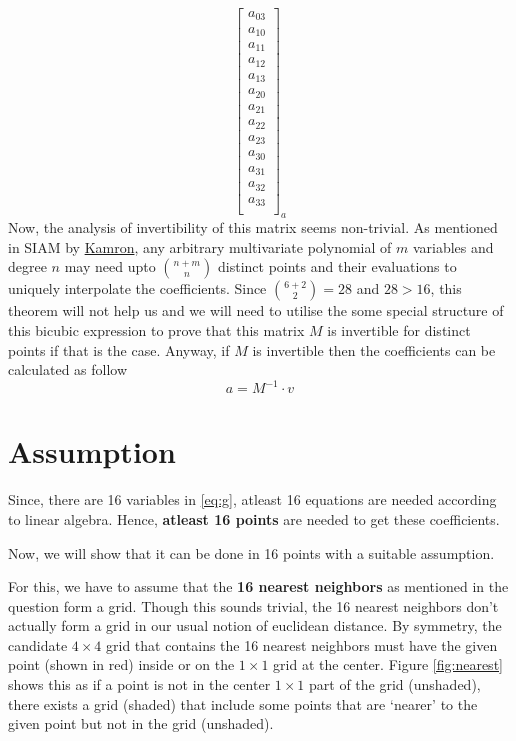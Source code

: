\documentclass[a4paper, landscape]{article}
\begin{document}
\begin{equation}
{\begin{bmatrix}
    a_{03}\\
    a_{10}\\
    a_{11}\\
    a_{12}\\
    a_{13}\\
    a_{20}\\
    a_{21}\\
    a_{22}\\
    a_{23}\\
    a_{30}\\
    a_{31}\\
    a_{32}\\
    a_{33}\\
    \end{bmatrix}
    }_{a}\label{eq:g}
\end{equation}
Now, the analysis of invertibility of this matrix seems non-trivial. As mentioned in SIAM by \href{https://evoq-n.org/Portals/0/Publications/SIURO/Vol1_Issue1/A_Simple_Expression_for_Multivariate.pdf}{Kamron}, any arbitrary multivariate polynomial of $m$ variables and degree $n$ may need upto $\binom{n+m}{n}$ distinct points and their evaluations to uniquely interpolate the coefficients. Since $\binom{6+2}{2}=28$ and $28>16$, this theorem will not help us and we will need to utilise the some special structure of this bicubic expression to prove that this matrix $M$ is invertible for distinct points if that is the case. Anyway, if $M$ is invertible then the coefficients can be calculated as follow
\begin{equation}
    a = M^{-1}\cdot v
\end{equation}
\section{Assumption}
Since, there are 16 variables in \ref{eq:g}, {atleast 16 equations} are needed according to linear algebra. Hence, \textbf{atleast 16 points} are needed to get these coefficients.

Now, we will show that it can be done in 16 points with a suitable assumption.

For this, we have to assume that the \textbf{16 nearest neighbors} as mentioned in the question form a grid. Though this sounds trivial, the 16 nearest neighbors don't actually form a grid in our usual notion of euclidean distance. By symmetry, the candidate $4\times4$ grid that contains the 16 nearest neighbors must have the given point (shown in red) inside or on the $1\times1$ grid at the center. Figure \ref{fig:nearest} shows this as if a point is not in the center $1\times1$ part of the grid (unshaded), there exists a grid (shaded) that include some points that are `nearer' to the given point but not in the grid (unshaded). 
\end{document}
